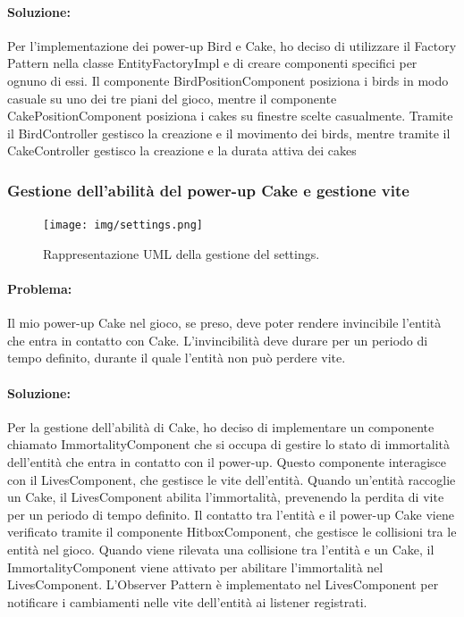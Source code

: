 \documentclass[a4paper,12pt]{report}
\begin{document}
\paragraph{Soluzione:}
Per l'implementazione dei power-up Bird e Cake, ho deciso di utilizzare il Factory Pattern nella classe EntityFactoryImpl e di creare componenti specifici per ognuno di essi. 
Il componente BirdPositionComponent posiziona i birds in modo casuale su uno dei tre piani del gioco, mentre il componente CakePositionComponent posiziona i cakes su finestre scelte casualmente. 
Tramite il BirdController gestisco la creazione e il movimento dei birds, mentre tramite il CakeController gestisco la creazione e la durata attiva dei cakes


\subsubsection{Gestione dell'abilità del power-up Cake e gestione vite}

\begin{figure}[H]
\centering{}
\texttt{[image: img/settings.png]}
\caption{Rappresentazione UML della gestione del settings.}
\end{figure}

\paragraph{Problema:}
Il mio power-up Cake nel gioco, se preso, deve poter rendere invincibile l'entità che entra in contatto con Cake. 
L'invincibilità deve durare per un periodo di tempo definito, durante il quale l'entità non può perdere vite.

\paragraph{Soluzione:}
Per la gestione dell'abilità di Cake, ho deciso di implementare un componente chiamato ImmortalityComponent che si occupa di gestire lo stato di immortalità dell'entità che entra in contatto con il power-up. 
Questo componente interagisce con il LivesComponent, che gestisce le vite dell'entità. 
Quando un'entità raccoglie un Cake, il LivesComponent abilita l'immortalità, prevenendo la perdita di vite per un periodo di tempo definito. 
Il contatto tra l'entità e il power-up Cake viene verificato tramite il componente HitboxComponent, che gestisce le collisioni tra le entità nel gioco. 
Quando viene rilevata una collisione tra l'entità e un Cake, il ImmortalityComponent viene attivato per abilitare l'immortalità nel LivesComponent. 
L'Observer Pattern è implementato nel LivesComponent per notificare i cambiamenti nelle vite dell'entità ai listener registrati. 
\end{document}
